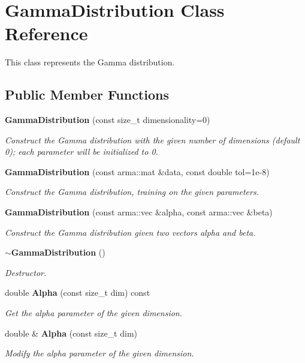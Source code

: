 \section{Gamma\+Distribution Class Reference}
\label{classmlpack_1_1distribution_1_1GammaDistribution}


This class represents the Gamma distribution.  


\subsection*{Public Member Functions}
\begin{DoxyCompactItemize}
\item 
\textbf{ Gamma\+Distribution} (const size\+\_\+t dimensionality=0)
\begin{DoxyCompactList}\small\item\em Construct the Gamma distribution with the given number of dimensions (default 0); each parameter will be initialized to 0. \end{DoxyCompactList}\item 
\textbf{ Gamma\+Distribution} (const arma\+::mat \&data, const double tol=1e-\/8)
\begin{DoxyCompactList}\small\item\em Construct the Gamma distribution, training on the given parameters. \end{DoxyCompactList}\item 
\textbf{ Gamma\+Distribution} (const arma\+::vec \&alpha, const arma\+::vec \&beta)
\begin{DoxyCompactList}\small\item\em Construct the Gamma distribution given two vectors alpha and beta. \end{DoxyCompactList}\item 
\textbf{ $\sim$\+Gamma\+Distribution} ()
\begin{DoxyCompactList}\small\item\em Destructor. \end{DoxyCompactList}\item 
double \textbf{ Alpha} (const size\+\_\+t dim) const
\begin{DoxyCompactList}\small\item\em Get the alpha parameter of the given dimension. \end{DoxyCompactList}\item 
double \& \textbf{ Alpha} (const size\+\_\+t dim)
\begin{DoxyCompactList}\small\item\em Modify the alpha parameter of the given dimension. \end{DoxyCompactList}\item 

\end{DoxyCompactItemize}
